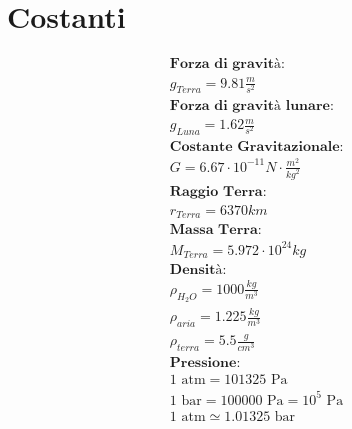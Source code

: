 \section{Costanti}

\begin{gather*}
    \textbf{Forza di gravità: } \\ g_{Terra} = 9.81 \frac{m}{s^2} \\
    \textbf{Forza di gravità lunare: } \\ g_{Luna} = 1.62 \frac{m}{s^2} \\
    \textbf{Costante Gravitazionale: } \\
    G = 6.67 \cdot 10^{-11} N \cdot \frac{m^2}{kg^2} \\
    \textbf{Raggio Terra: } \\ r_{Terra} = 6370 km \\
    \textbf{Massa Terra: } \\ M_{Terra} = 5.972 \cdot 10^{24} kg \\
    \textbf{Densità: } \\
    \rho_{H_2O} = 1000 \frac{kg}{m^3} \\
    \rho_{aria} = 1.225 \frac{kg}{m^3} \\
    \rho_{terra} = 5.5 \frac{g}{cm^3} \\
    \textbf{Pressione: } \\
    1 \text{ atm} = 101 325 \text{ Pa} \\
    1 \text{ bar} = 100 000 \text{ Pa} = 10^5 \text{ Pa} \\
    1 \text{ atm} \simeq 1.01325 \text{ bar}
\end{gather*}
